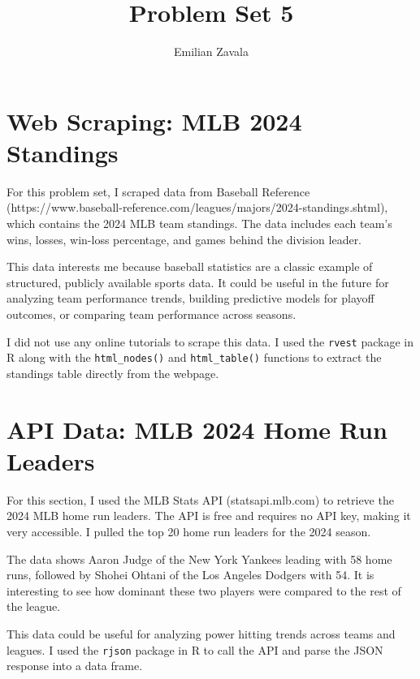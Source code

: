 \documentclass{article}
\begin{document}
\title{Problem Set 5}
\author{Emilian Zavala}
\date{}
\maketitle

\section*{Web Scraping: MLB 2024 Standings}

For this problem set, I scraped data from Baseball Reference
(https://www.baseball-reference.com/leagues/majors/2024-standings.shtml), which contains the 2024 MLB team standings. The data includes each team's wins, losses, win-loss percentage, and games behind the division leader.

This data interests me because baseball statistics are a classic example of structured, publicly available sports data. It could be useful in the future for analyzing team performance trends, building predictive models for playoff outcomes, or comparing team performance across seasons.

I did not use any online tutorials to scrape this data. I used the
\texttt{rvest} package in R along with the \texttt{html\_nodes()} and
\texttt{html\_table()} functions to extract the standings table directly
from the webpage.

\section*{API Data: MLB 2024 Home Run Leaders}

For this section, I used the MLB Stats API (statsapi.mlb.com) to retrieve the 2024 MLB home run leaders. The API is free and requires no API key, making it very accessible. I pulled the top 20 home run leaders for the 2024 season.

The data shows Aaron Judge of the New York Yankees leading with 58 home runs, followed by Shohei Ohtani of the Los Angeles Dodgers with 54. It is interesting to see how dominant these two players were compared to the rest of the league.

This data could be useful for analyzing power hitting trends across teams and leagues. I used the \texttt{rjson} package in R to call the API and parse the JSON response into a data frame.
\end{document}

